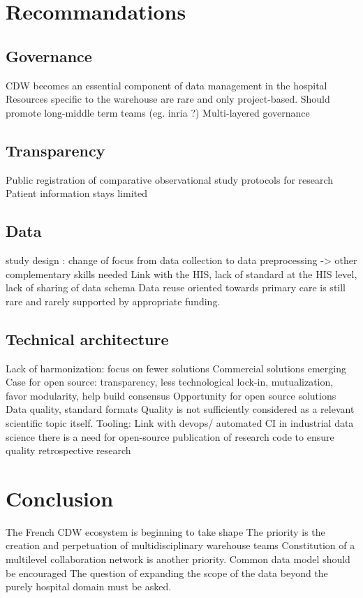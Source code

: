 \documentclass{report}
\begin{document}
\section{Recommandations}

\subsection{Governance}
CDW becomes an essential component of data management in the hospital
Resources specific to the warehouse are rare and only project-based. Should promote long-middle term teams (eg. inria ?)
Multi-layered governance
\subsection{Transparency}
Public registration of comparative observational study protocols for research
Patient information stays limited
\subsection{Data}
study design : change of focus from data collection to data preprocessing -> other complementary skills needed
Link with the HIS, lack of standard at the HIS level, lack of sharing of data schema
Data reuse oriented towards primary care is still rare and rarely supported by appropriate funding.


\subsection{Technical architecture}
Lack of harmonization: focus on fewer solutions
Commercial solutions emerging
Case for open source: transparency, less technological lock-in, mutualization, favor modularity, help build consensus
Opportunity for open source solutions
Data quality, standard formats
Quality is not sufficiently considered as a relevant scientific topic itself.
Tooling: Link with devops/ automated CI in industrial data science
there is a need for open-source publication of research code to ensure quality retrospective research

\section{Conclusion}
The French CDW ecosystem is beginning to take shape
The priority is the creation and perpetuation of multidisciplinary warehouse teams
Constitution of a multilevel collaboration network is another priority.
Common data model should be encouraged
The question of expanding the scope of the data beyond the purely hospital domain must be asked.
\end{document}
